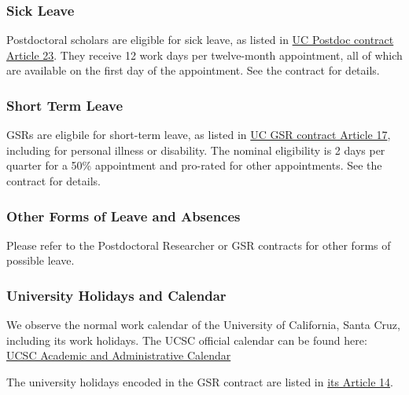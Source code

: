 \subsubsection{Sick Leave}

Postdoctoral scholars are eligible for sick leave, as listed in \href{https://ucnet.universityofcalifornia.edu/wp-content/uploads/labor/bargaining-units/px/docs/px_tentative_agremeents_effective_12-09-2022.pdf}{UC Postdoc contract Article 23}. They receive 12 work days per twelve-month appointment, all of which are available on the first day of the appointment.  See the contract for details.

\subsubsection{Short Term Leave}

GSRs are eligbile for short-term leave, as listed in \href{https://ucnet.universityofcalifornia.edu/wp-content/uploads/labor/bargaining-units/br/docs/br_17_leaves_2022-2025.pdf}{UC GSR contract Article 17}, including for personal illness or disability. The nominal eligibility is 2 days per quarter for a 50\% appointment and pro-rated for other appointments. See the contract for details.


\subsubsection{Other Forms of Leave and Absences}

Please refer to the Postdoctoral Researcher or GSR contracts for other forms of possible leave. 

\subsubsection{University Holidays and Calendar}

We observe the normal work calendar of the University of California, Santa Cruz, including its work holidays.
The UCSC official calendar can be found here:\\

\noindent
\href{https://registrar.ucsc.edu/calendar/academiccalendar.html}{UCSC Academic and Administrative Calendar}

\noindent
The university holidays encoded in the GSR contract are listed in \href{https://qa.ucnet.universityofcalifornia.edu/labor/bargaining-units/br/docs/br_14_holidays_2022-2025.pdf}{its Article 14}.
